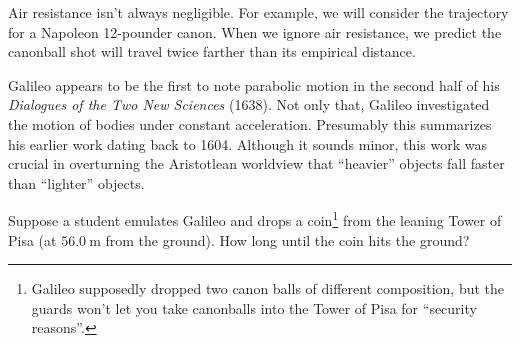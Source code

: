 \begin{remark}[Assumptions]
Air resistance isn't always negligible. For example, we will consider
the trajectory for a Napoleon 12-pounder canon. When we ignore air
resistance, we predict the canonball shot will travel twice farther
than its empirical distance.
\end{remark}

\begin{remark}
Galileo appears to be the first to note parabolic motion in the second
half of his \emph{Dialogues of the Two New Sciences} (1638). Not only
that, Galileo investigated the motion of bodies under constant
acceleration. Presumably this summarizes his earlier work dating back to
1604. Although it sounds minor, this work was crucial in overturning the
Aristotlean worldview that ``heavier'' objects fall faster than
``lighter'' objects.
\end{remark}

\workedExamples{}

Suppose a student emulates Galileo and drops a coin\footnote{Galileo
  supposedly dropped two canon balls of different composition, but
  the guards won't let you take canonballs into the Tower of Pisa for
  ``security reasons''.} from the
leaning Tower of Pisa (at $\SI{56.0}{\meter}$ from the ground). How
long until the coin hits the ground?

